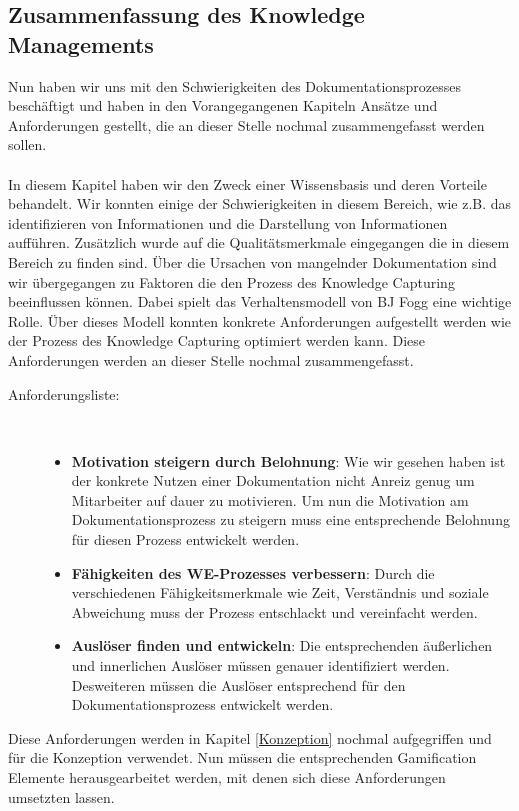 \documentclass[a4paper,12pt,twoside]{scrartcl}
\begin{document}
\subsection{Zusammenfassung des Knowledge Managements}
\label{Zusammenfassung des Knowledge Managements}
Nun haben wir uns mit den Schwierigkeiten des Dokumentationsprozesses beschäftigt und haben in den Vorangegangenen Kapiteln Ansätze und Anforderungen gestellt, die an dieser Stelle nochmal zusammengefasst werden sollen.
\\\\
In diesem Kapitel haben wir den Zweck einer Wissensbasis und deren Vorteile behandelt. Wir konnten einige der Schwierigkeiten in diesem Bereich, wie z.B. das identifizieren von Informationen und die Darstellung von Informationen aufführen. Zusätzlich wurde auf die Qualitätsmerkmale eingegangen die in diesem Bereich zu finden sind. Über die Ursachen von mangelnder Dokumentation sind wir übergegangen zu Faktoren die den Prozess des Knowledge Capturing beeinflussen können. Dabei spielt das Verhaltensmodell von BJ Fogg eine wichtige Rolle. Über dieses Modell konnten konkrete Anforderungen aufgestellt werden wie der Prozess des Knowledge Capturing optimiert werden kann. Diese Anforderungen werden an dieser Stelle nochmal zusammengefasst.
\begin{description}
   \item[Anforderungsliste:]~\par
   \begin{itemize}
      \item \textbf{Motivation steigern durch Belohnung}: Wie wir gesehen haben ist der konkrete Nutzen einer Dokumentation nicht Anreiz genug um Mitarbeiter auf dauer zu motivieren. Um nun die Motivation am Dokumentationsprozess zu steigern muss eine entsprechende Belohnung für diesen Prozess entwickelt werden.
      \item \textbf{Fähigkeiten des WE-Prozesses verbessern}: Durch die verschiedenen Fähigkeitsmerkmale wie Zeit, Verständnis und soziale Abweichung muss der Prozess entschlackt und vereinfacht werden.
      \item \textbf{Auslöser finden und entwickeln}: Die entsprechenden äußerlichen und innerlichen Auslöser müssen genauer identifiziert werden. Desweiteren müssen die Auslöser entsprechend für den Dokumentationsprozess entwickelt werden.
   \end{itemize}
\end{description}
Diese Anforderungen werden in Kapitel \ref{Konzeption} nochmal aufgegriffen und für die Konzeption verwendet. Nun müssen die entsprechenden Gamification Elemente herausgearbeitet werden, mit denen sich diese Anforderungen umsetzten lassen.    
\newpage
\end{document}
